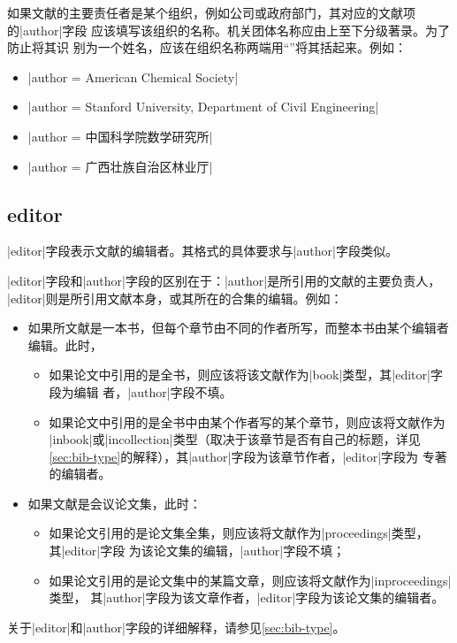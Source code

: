如果文献的主要责任者是某个组织，例如公司或政府部门，其对应的文献项的|author|字段
应该填写该组织的名称。机关团体名称应由上至下分级著录。为了防止{\BibTeX}将其识
别为一个姓名，应该在组织名称两端用``{}''将其括起来。例如：
\begin{itemize}
\item |author = {{American Chemical Society}}|
\item |author = {{Stanford University, Department of Civil Engineering}}|
\item |author = {{中国科学院数学研究所}}|
\item |author = {{广西壮族自治区林业厅}}|
\end{itemize}

\subsection{editor}\label{subsec:bibfield-editor}

|editor|字段表示文献的编辑者。其格式的具体要求与|author|字段类似。

|editor|字段和|author|字段的区别在于：|author|是所引用的文献的主要负责人，
|editor|则是所引用文献本身，或其所在的合集的编辑。例如：
\begin{itemize}
\item 如果所文献是一本书，但每个章节由不同的作者所写，而整本书由某个编辑者编辑。此时，
  \begin{itemize}
  \item 如果论文中引用的是全书，则应该将该文献作为|book|类型，其|editor|字段为编辑
    者，|author|字段不填。
  \item 如果论文中引用的是全书中由某个作者写的某个章节，则应该将文献作为
    |inbook|或|incollection|类型（取决于该章节是否有自己的标题，详见
    \ref{sec:bib-type}的解释），其|author|字段为该章节作者，|editor|字段为
    专著的编辑者。
  \end{itemize}
\item 如果文献是会议论文集，此时：
  \begin{itemize}
  \item 如果论文引用的是论文集全集，则应该将文献作为|proceedings|类型，其|editor|字段
    为该论文集的编辑，|author|字段不填；
  \item 如果论文引用的是论文集中的某篇文章，则应该将文献作为|inproceedings|类型，
    其|author|字段为该文章作者，|editor|字段为该论文集的编辑者。
  \end{itemize}
\end{itemize}

关于|editor|和|author|字段的详细解释，请参见\ref{sec:bib-type}。

